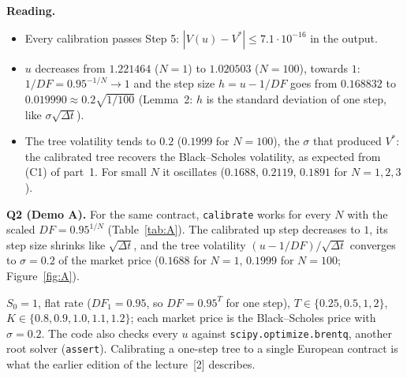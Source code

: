 \documentclass[11pt,a4paper]{article}
\newcommand{\ansbox}[1]{\begin{ansboxenv}#1\end{ansboxenv}}
\newcommand{\subhead}[1]{\par\medskip\noindent{\large\bfseries #1}\par\smallskip\noindent\ignorespaces}
\begin{document}
\par\medskip\noindent\textbf{Reading.}
\begin{itemize}
\item Every calibration passes Step 5: $|V(u)-V^*|\le7.1\cdot10^{-16}$ in the output.
\item $u$ decreases from $1.221464$ ($N=1$) to $1.020503$ ($N=100$), towards $1$: $1/DF=0.95^{-1/N}\to1$ and the step size $h=u-1/DF$ goes from $0.168832$ to $0.019990\approx0.2\sqrt{1/100}$ (Lemma~2: $h$ is the standard deviation of one step, like $\sigma\sqrt{\Delta t}$).
\item The tree volatility tends to $0.2$ ($0.1999$ for $N=100$), the $\sigma$ that produced $V^*$: the calibrated tree recovers the Black--Scholes volatility, as expected from (C1) of part~1. For small $N$ it oscillates ($0.1688$, $0.2119$, $0.1891$ for $N=1,2,3$).
\end{itemize}

\ansbox{\textbf{Q2 (Demo A).} For the same contract, \texttt{calibrate} works for every $N$ with the scaled $DF=0.95^{1/N}$ (Table~\ref{tab:A}). The calibrated up step decreases to $1$, its step size shrinks like $\sqrt{\Delta t}$, and the tree volatility $(u-1/DF)/\sqrt{\Delta t}$ converges to $\sigma=0.2$ of the market price ($0.1688$ for $N=1$, $0.1999$ for $N=100$; Figure~\ref{fig:A}).}

\subhead{Q3 --- Demo B: one-step tree for several contracts.}
$S_0=1$, flat rate ($DF_1=0.95$, so $DF=0.95^{T}$ for one step), $T\in\{0.25,0.5,1,2\}$, $K\in\{0.8,0.9,1.0,1.1,1.2\}$; each market price is the Black--Scholes price with $\sigma=0.2$. The code also checks every $u$ against \texttt{scipy.optimize.brentq}, another root solver (\texttt{assert}). Calibrating a one-step tree to a single European contract is what the earlier edition of the lecture~[2] describes.

\begin{center}
\label{fig:fB}
\end{center}
\end{document}
